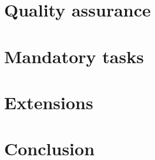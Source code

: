 
%


	
	\frontmatter
		
	\newpage	
	\tableofcontents 
	
	
	\mainmatter
	
	\chapter{Quality assurance}
	
	 
	
	\chapter{Mandatory tasks}
	
	
	
	
	
	\chapter{Extensions}
	
	
	
	\chapter{Conclusion}
	
	
	\backmatter
	

